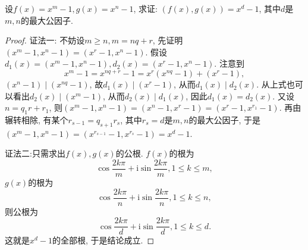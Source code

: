\documentclass[../../main.tex]{subfiles}
\begin{document}
\begin{proposition}\label{proposition:n方差的最大公因式}
设\(f(x)=x^m - 1, g(x)=x^n - 1\), 求证: \((f(x),g(x))=x^d - 1\), 其中\(d\)是\(m,n\)的最大公因子.
\end{proposition}
\begin{proof}
{\color{blue}证法一:}
不妨设\(m\geq n, m = nq + r\), 先证明\((x^m - 1,x^n - 1)=(x^r - 1,x^n - 1)\). 假设\(d_1(x)=(x^m - 1,x^n - 1), d_2(x)=(x^r - 1,x^n - 1)\). 注意到
\[
x^m - 1=x^{nq + r}-1=x^r(x^{nq}-1)+(x^r - 1),
\]
\((x^n - 1)\mid(x^{nq}-1)\), 故\(d_1(x)\mid(x^r - 1)\), 从而\(d_1(x)\mid d_2(x)\). 从上式也可以看出\(d_2(x)\mid(x^m - 1)\), 从而\(d_2(x)\mid d_1(x)\), 因此\(d_1(x)=d_2(x)\). 又设\(n = q_1r + r_1\), 则\((x^m - 1,x^n - 1)=(x^n - 1,x^r - 1)=(x^r - 1,x^{r_1}-1)\). 再由辗转相除, 有某个\(r_{s - 1}=q_{s + 1}r_s\), 其中\(r_s = d\)是\(m,n\)的最大公因子, 于是\((x^m - 1,x^n - 1)=(x^{r_{s - 1}}-1,x^{r_s}-1)=x^d - 1\).

{\color{blue}证法二:}只需求出\(f(x),g(x)\)的公根. \(f(x)\)的根为
\[
\cos\frac{2k\pi}{m}+\mathrm{i}\sin\frac{2k\pi}{m}, 1\leq k\leq m,
\]
\(g(x)\)的根为
\[
\cos\frac{2k\pi}{n}+\mathrm{i}\sin\frac{2k\pi}{n}, 1\leq k\leq n,
\]
则公根为
\[
\cos\frac{2k\pi}{d}+\mathrm{i}\sin\frac{2k\pi}{d}, 1\leq k\leq d.
\]
这就是\(x^d - 1\)的全部根, 于是结论成立.
\end{proof}
\end{document}
